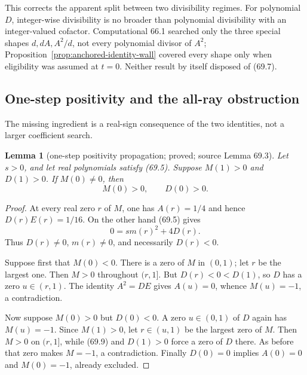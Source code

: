 \documentclass[10pt,reqno]{amsart}
\newtheorem{lemma}[theorem]{Lemma}
\theoremstyle{definition}
\newcommand{\1}{\mathbf 1}
\begin{document}
This corrects the apparent split between two divisibility regimes.  For
polynomial $D$, integer-wise divisibility is no broader than polynomial
divisibility with an integer-valued cofactor.  Computational 66.1 searched
only the three special shapes $d,dA,A^2/d$, not every polynomial divisor of
$A^2$; Proposition~\ref{prop:anchored-identity-wall} covered every shape
only when eligibility was assumed at $t=0$.  Neither result by itself
disposed of (69.7).

\subsection{One-step positivity and the all-ray obstruction}
The missing ingredient is a real-sign consequence of the two identities,
not a larger coefficient search.

\begin{lemma}[one-step positivity propagation; proved; source Lemma 69.3]
\label{lem:positivity-propagation}
Let $s>0$, and let real polynomials satisfy (69.5).  Suppose $M(1)>0$ and
$D(1)>0$.  If $M(0)\ne0$, then
\begin{equation}\tag{69.8}
                         M(0)>0,\qquad D(0)>0.
\end{equation}
\end{lemma}
\begin{proof}
At every real zero $r$ of $M$, one has $A(r)=1/4$ and hence
$D(r)E(r)=1/16$.  On the other hand (69.5) gives
\begin{equation}\tag{69.9}
             0=s m(r)^2+4D(r).
\end{equation}
Thus $D(r)\ne0$, $m(r)\ne0$, and necessarily $D(r)<0$.

Suppose first that $M(0)<0$.  There is a zero of $M$ in $(0,1)$; let $r$
be the largest one.  Then $M>0$ throughout $(r,1]$.  But
$D(r)<0<D(1)$, so $D$ has a zero $u\in(r,1)$.  The identity $A^2=DE$ gives
$A(u)=0$, whence $M(u)=-1$, a contradiction.

Now suppose $M(0)>0$ but $D(0)<0$.  A zero $u\in(0,1)$ of $D$ again has
$M(u)=-1$.  Since $M(1)>0$, let $r\in(u,1)$ be the largest zero of $M$.
Then $M>0$ on $(r,1]$, while (69.9) and $D(1)>0$ force a zero of $D$
there.  As before that zero makes $M=-1$, a contradiction.  Finally
$D(0)=0$ implies $A(0)=0$ and $M(0)=-1$, already excluded.
\end{proof}
\end{document}
